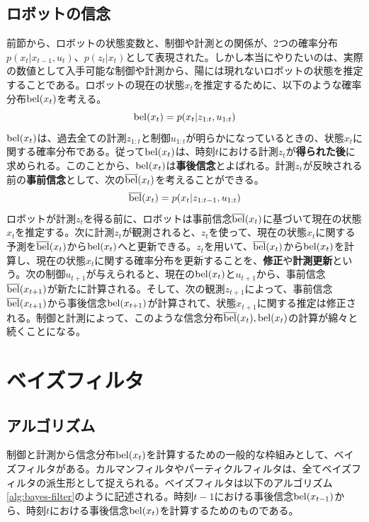 \documentclass[dvipdfmx,a4paper]{jsarticle}
\begin{document}
\subsection{ロボットの信念}
前節から、ロボットの状態変数と、制御や計測との関係が、2つの確率分布$p(x_t | x_{t - 1}, u_t)$、$p(z_t | x_t)$として表現された。しかし本当にやりたいのは、実際の数値として入手可能な制御や計測から、陽には現れないロボットの状態を推定することである。ロボットの現在の状態$x_t$を推定するために、以下のような確率分布$\operatorname{bel}(x_t)$を考える。
\begin{equation}
	\operatorname{bel}(x_t) = p(x_t | z_{1 : t}, u_{1 : t})
\end{equation}
$\operatorname{bel}(x_t)$は、過去全ての計測$z_{1 : t}$と制御$u_{1 : t}$が明らかになっているときの、状態$x_t$に関する確率分布である。従って$\operatorname{bel}(x_t)$は、時刻$t$における計測$z_t$が\textbf{得られた後}に求められる。このことから、$\operatorname{bel}(x_t)$は\textbf{事後信念}とよばれる。計測$z_t$が反映される前の\textbf{事前信念}として、次の$\operatorname{\overline{bel}}(x_t)$を考えることができる。
\begin{equation}
	\operatorname{\overline{bel}}(x_t) = p(x_t | z_{1 : t - 1}, u_{1 : t})
\end{equation}
ロボットが計測$z_t$を得る前に、ロボットは事前信念$\operatorname{\overline{bel}}(x_t)$に基づいて現在の状態$x_t$を推定する。次に計測$z_t$が観測されると、$z_t$を使って、現在の状態$x_t$に関する予測を$\operatorname{\overline{bel}}(x_t)$から$\operatorname{bel}(x_t)$へと更新できる。$z_t$を用いて、$\operatorname{\overline{bel}}(x_t)$から$\operatorname{bel}(x_t)$を計算し、現在の状態$x_t$に関する確率分布を更新することを、\textbf{修正}や\textbf{計測更新}という。次の制御$u_{t + 1}$が与えられると、現在の$\operatorname{bel}(x_t)$と$u_{t + 1}$から、事前信念$\operatorname{\overline{bel}}(x_{t + 1})$が新たに計算される。そして、次の観測$z_{t + 1}$によって、事前信念$\operatorname{\overline{bel}}(x_{t + 1})$から事後信念$\operatorname{bel}(x_{t + 1})$が計算されて、状態$x_{t + 1}$に関する推定は修正される。制御と計測によって、このような信念分布$\operatorname{\overline{bel}}(x_t), \operatorname{bel}(x_t)$の計算が綿々と続くことになる。

\section{ベイズフィルタ}
\subsection{アルゴリズム}
制御と計測から信念分布$\operatorname{bel}(x_t)$を計算するための一般的な枠組みとして、ベイズフィルタがある。カルマンフィルタやパーティクルフィルタは、全てベイズフィルタの派生形として捉えられる。ベイズフィルタは以下のアルゴリズム\ref{alg:bayes-filter}のように記述される。時刻$t - 1$における事後信念$\operatorname{bel}(x_{t - 1})$から、時刻$t$における事後信念$\operatorname{bel}(x_t)$を計算するためのものである。
\end{document}
